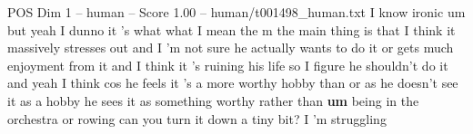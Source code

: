 \begin{textsample}{POS Dim 1 – human – Score 1.00 – human/t001498\_human.txt}  \label{ex:f1_pos_002}
I know ironic um but yeah I dunno it 's what what I mean the m the main thing is that I think it massively stresses out and I 'm not sure he actually wants to do it or gets much enjoyment from it and I think it 's ruining his life so I figure he shouldn't do it and yeah I think cos he feels it 's a more worthy hobby than or as he doesn't see it as a hobby he sees it as something worthy rather than \textbf{um} being in the orchestra or rowing can you turn it down a tiny bit?
I 'm struggling

\end{textsample}
